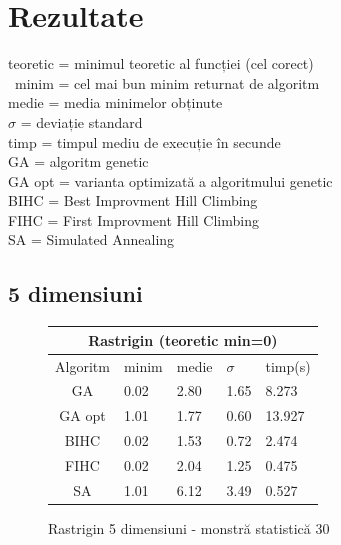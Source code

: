 \documentclass{article}
\begin{document}
\section{Rezultate}
teoretic = minimul teoretic al funcției (cel corect)\\\
minim = cel mai bun minim returnat de algoritm\\
medie = media minimelor obținute\\
$\sigma$ = deviație standard\\
timp = timpul mediu de execuție în secunde\\
GA = algoritm genetic\\
GA opt = varianta optimizată a algoritmului genetic\\
BIHC = Best Improvment Hill Climbing\\
FIHC = First Improvment Hill Climbing\\
SA = Simulated Annealing


\subsection{5 dimensiuni}

\begin{figure}[!h]
\begin{tabular}{||c|||l|l|l|l||}
  \hline
  \multicolumn{5}{||c||}{Rastrigin (teoretic min=0)} \\ \hline
  Algoritm & minim & medie & $\sigma$ & timp(s) \\ \hline \hline
  GA & 0.02 & 2.80 & 1.65 & 8.273 \\ \hline
  GA opt& 1.01 & 1.77 & 0.60 & 13.927 \\ \hline
  BIHC & 0.02 & 1.53 & 0.72 & 2.474\\ \hline
  FIHC & 0.02 & 2.04 & 1.25 & 0.475 \\ \hline
  SA & 1.01 & 6.12 & 3.49 & 0.527 \\ \hline
\end{tabular}
\caption{Rastrigin 5 dimensiuni - monstră statistică 30} 
\end{figure}
\end{document}
